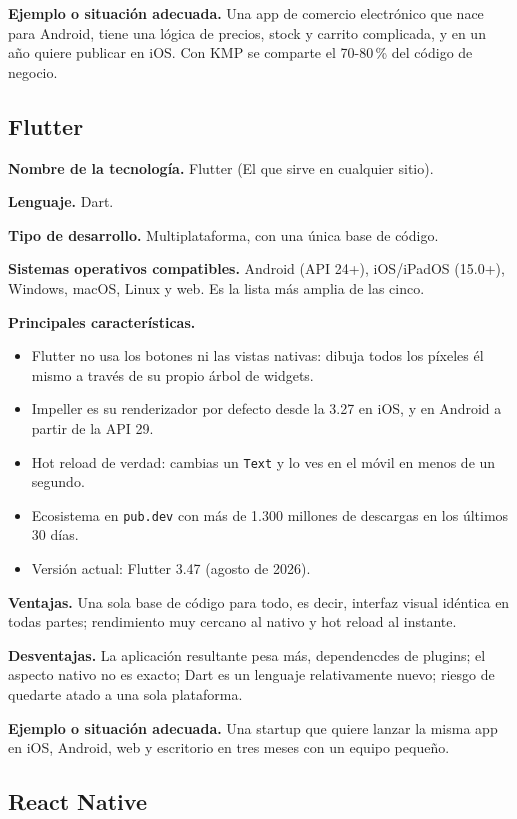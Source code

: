 \documentclass[11pt,a4paper]{article}
\newcommand{\code}[1]{\texttt{\color{navylight}#1}}
\newcommand{\campo}[1]{\textbf{\color{navy}#1}}
\begin{document}
	\campo{Ejemplo o situación adecuada.} Una app de comercio electrónico que nace para Android, tiene una lógica de precios, stock y carrito complicada, y en un año quiere publicar en iOS. Con KMP se comparte el 70-80\,\% del código de negocio.
	
	\subsection{Flutter}
	
  \campo{Nombre de la tecnología.} Flutter (El que sirve en cualquier sitio).
	
	\campo{Lenguaje.} Dart.
	
	\campo{Tipo de desarrollo.} Multiplataforma, con una única base de código.
	
	\campo{Sistemas operativos compatibles.} Android (API 24+), iOS/iPadOS (15.0+), Windows, macOS, Linux y web. Es la lista más amplia de las cinco.
	
	\campo{Principales características.}
	\begin{itemize}[leftmargin=*,itemsep=0.2em,topsep=0.2em]
		\item Flutter no usa los botones ni las vistas nativas: dibuja todos los píxeles él mismo a través de su propio árbol de widgets.
		\item Impeller es su renderizador por defecto desde la 3.27 en iOS, y en Android a partir de la API 29.
		\item Hot reload de verdad: cambias un \code{Text} y lo ves en el móvil en menos de un segundo.
		\item Ecosistema en \code{pub.dev} con más de 1.300 millones de descargas en los últimos 30 días.
		\item Versión actual: Flutter 3.47 (agosto de 2026).
	\end{itemize}
	
	\campo{Ventajas.} Una sola base de código para todo, es decir, interfaz visual idéntica en todas partes; rendimiento muy cercano al nativo y hot reload al instante.
	
	\campo{Desventajas.} La aplicación resultante pesa más, dependencdes de plugins; el aspecto nativo no es exacto; Dart es un lenguaje relativamente nuevo; riesgo de quedarte atado a una sola plataforma.
	
	\campo{Ejemplo o situación adecuada.} Una startup que quiere lanzar la misma app en iOS, Android, web y escritorio en tres meses con un equipo pequeño.
	
	\subsection{React Native}
	
\end{document}
